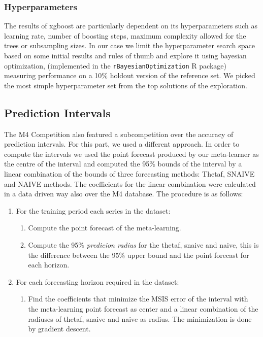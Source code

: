 \documentclass[11pt,a4paper,]{article}
\providecommand{\tightlist}{%
  \setlength{\itemsep}{0pt}\setlength{\parskip}{0pt}}
\theoremstyle{definition}
\theoremstyle{definition}
\theoremstyle{definition}
\theoremstyle{remark}
\begin{document}
\subsubsection{Hyperparameters}\label{hyperparameters}

The results of xgboost are particularly dependent on its hyperparameters
such as learning rate, number of boosting steps, maximum complexity
allowed for the trees or subsampling sizes. In our case we limit the
hyperparameter search space based on some initial results and rules of
thumb and explore it using bayesian optimization, (implemented in the
\texttt{rBayesianOptimization} R package) measuring performance on a
10\% holdout version of the reference set. We picked the most simple
hyperparameter set from the top solutions of the exploration.

\subsection{Prediction Intervals}\label{prediction-intervals}

The M4 Competition also featured a subcompetition over the accuracy of
prediction intervals. For this part, we used a different approach. In
order to compute the intervals we used the point forecast produced by
our meta-learner as the centre of the interval and computed the 95\%
bounds of the interval by a linear combination of the bounds of three
forecasting methods: Thetaf, SNAIVE and NAIVE methods. The coefficients
for the linear combination were calculated in a data driven way also
over the M4 database. The procedure is as follows:

\begin{enumerate}
\def\labelenumi{\arabic{enumi}.}
\tightlist
\item
  For the training period each series in the dataset:

  \begin{enumerate}
  \def\labelenumii{\arabic{enumii}.}
  \tightlist
  \item
    Compute the point forecast of the meta-learning.
  \item
    Compute the 95\% \emph{predicion radius} for the thetaf, snaive and
    naive, this is the difference between the 95\% upper bound and the
    point forecast for each horizon.
  \end{enumerate}
\item
  For each forecasting horizon required in the dataset:

  \begin{enumerate}
  \def\labelenumii{\arabic{enumii}.}
  \tightlist
  \item
    Find the coefficients that minimize the MSIS error of the interval
    with the meta-learning point forecast as center and a linear
    combination of the radiuses of thetaf, snaive and naive as radius.
    The minimization is done by gradient descent.
  \end{enumerate}
\end{enumerate}
\end{document}
